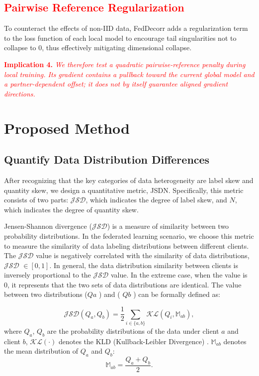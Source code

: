 \documentclass[journal,twoside,web]{ieeecolor}
\newcommand{\rev}[1]{\textcolor{red}{#1}}
\begin{document}
\subsection{\rev{Pairwise Reference Regularization}}

To counteract the effects of non-IID data, FedDecorr\cite{pami} adds a regularization term to the loss function of each local model to encourage tail singularities not to collapse to 0, thus effectively mitigating dimensional collapse.

\noindent \textbf{\rev{Implication 4.}} \rev{\textit{We therefore test a quadratic pairwise-reference penalty during local training. Its gradient contains a pullback toward the current global model and a partner-dependent offset; it does not by itself guarantee aligned gradient directions.}}




\section{Proposed Method}
\subsection{Quantify Data Distribution Differences}
After recognizing that the key categories of data heterogeneity are label skew and quantity skew, we design a quantitative metric, JSDN. Specifically, this metric consists of two parts: $\mathcal{JSD}$, which indicates the degree of label skew, and $N$, which indicates the degree of quantity skew.

Jensen-Shannon divergence ($\mathcal{JSD}$) is a measure of similarity between two probability distributions\cite{jsd}. In the federated learning scenario, we choose this metric to measure the similarity of data labeling distributions between different clients. The $\mathcal{JSD}$ value is negatively correlated with the similarity of data distributions, $\mathcal{JSD}$ $\in [0, 1]$. 
In general, the data distribution similarity between clients is inversely proportional to the $\mathcal{JSD}$ value.
In the extreme case, when the  value is 0, it represents that the two sets of data distributions are identical.
The value between two distributions ($ Qa $ ) and ( $Qb$ ) can be formally defined as:

\begin{equation}
\mathcal{JSD}(Q_a,Q_b) = \frac{1}{2} \sum_{i \in \{a, b\}} \mathcal{KL}(Q_i, \mathbb{M}_{ab}),
\end{equation}
where $Q_a$, $Q_b$ are the probability distributions of the data under client $a$ and client $b$, $\mathcal{KL}(\cdot)$ denotes the KLD (Kullback-Leibler Divergence) \cite{kl}. $\mathbb{M}_{ab}$ denotes the mean distribution of $Q_a$ and $Q_b$:
\begin{equation}
\mathbb{M}_{ab} = \frac{Q_a + Q_b}{2}.
\end{equation}
\end{document}
